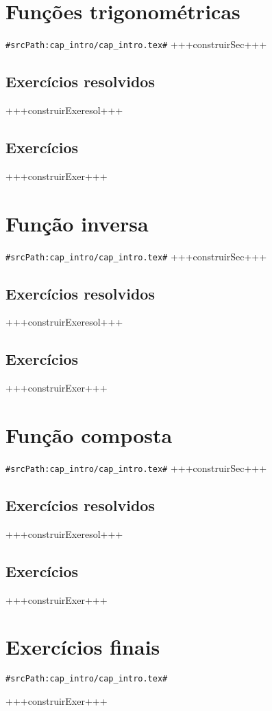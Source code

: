 \section{Funções trigonométricas}
\verb+#srcPath:cap_intro/cap_intro.tex#+
\label{sec:intro_trigo}
+++construirSec+++

\subsection*{Exercícios resolvidos}

+++construirExeresol+++


\subsection*{Exercícios}

+++construirExer+++


\section{Função inversa}
\verb+#srcPath:cap_intro/cap_intro.tex#+
\label{sec:intro_inversa}
+++construirSec+++

\subsection*{Exercícios resolvidos}

+++construirExeresol+++


\subsection*{Exercícios}

+++construirExer+++


\section{Função composta}
\verb+#srcPath:cap_intro/cap_intro.tex#+
\label{sec:intro_composta}
+++construirSec+++


\subsection*{Exercícios resolvidos}

+++construirExeresol+++

\subsection*{Exercícios}

+++construirExer+++

\section{Exercícios finais}
\verb+#srcPath:cap_intro/cap_intro.tex#+


+++construirExer+++
